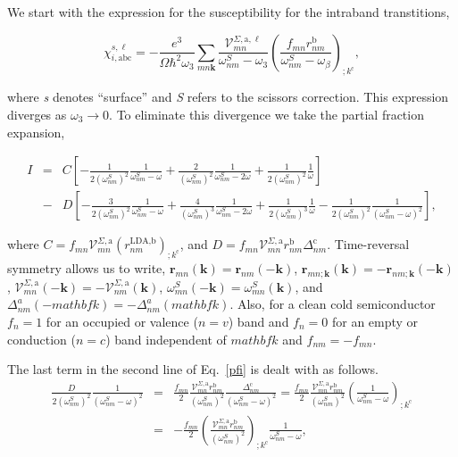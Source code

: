 \documentclass[11pt,draft]{article}
\begin{document}
We start with the expression for the susceptibility for the intraband transtitions,

\begin{equation}\label{chii}
\chi_{i,\text{a}\text{b}\text{c}}^{s,\ell}=-\frac{e^3}{\Omega\hbar^2\omega_3}\sum_{mn\mathbf{k}}\frac{\mathcal{V}_{mn}^{\Sigma,\text{a},\ell}}{\omega^S_{nm}-\omega_3}\left(\frac{f_{mn}r_{nm}^{\text{b}}}{\omega^S_{nm}-\omega_\beta}\right)_{;k^{\text{c}}},
\end{equation} 

where \emph{s} denotes ``surface'' and \emph{S} refers to the scissors correction. This expression diverges as $\omega_{3} \rightarrow 0$. To eliminate this divergence we take the partial fraction expansion,

\begin{eqnarray}\label{pfi} 
I &=& C \left[-\frac{1}{2(\omega^{S}_{nm})^{2}}\frac{1}{\omega^{S}_{nm}-\omega}+\frac{2}{(\omega^{S}_{nm})^{2}}\frac{1}{\omega^{S}_{nm}-2\omega}+\frac{1}{2(\omega^{S}_{nm})^{2}}\frac{1}{\omega}\right]\nonumber\\
&-& D \left[-\frac{3}{2(\omega^{S}_{nm})^{2}}\frac{1}{\omega^{S}_{nm}-\omega}+\frac{4}{(\omega^{S}_{nm})^{3}}\frac{1}{\omega^{S}_{nm}-2\omega}+\frac{1}{2(\omega^{S}_{nm})^{3}}\frac{1}{\omega}-\frac{1}{2(\omega^{S}_{nm})^{2}}\frac{1}{(\omega^{S}_{nm}-\omega)^2}\right],
\end{eqnarray} 

where $C = f_{mn}\mathcal{V}^{\Sigma,\text{a}}_{mn}(r^{\text{LDA},\text{b}}_{nm})_{;k^{\text{c}}}$, and $D=f_{mn}\mathcal{V}^{\Sigma,\text{a}}_{mn}r^{\text{b}}_{nm}\Delta^{\text{c}}_{nm}$. Time-reversal symmetry allows us to write, $\mathbf{r}_{mn}(\mathbf{k})=\mathbf{r}_{nm}(-\mathbf{k})$, $\mathbf{r}_{mn;\mathbf{k}}(\mathbf{k})=-\mathbf{r}_{nm;\mathbf{k}}(-\mathbf{k})$, $\mathbf{\mathcal{V}}_{mn}^{\Sigma,\text{a}}(-\mathbf{k})=-\mathbf{\mathcal{V}}_{nm}^{\Sigma,\text{a}}(\mathbf{k})$, $\omega_{mn}^{S}(-\mathbf{k})=\omega_{mn}^{S}(\mathbf{k})$, and $\Delta^a_{nm}(-mathbf{k})=-\Delta^a_{nm}(mathbf{k})$. Also, for a clean cold semiconductor $f_n=1$  for an occupied or valence ($n=v$) band and $f_n=0$ for an empty or conduction ($n=c$) band independent of $mathbf{k}$ and $f_{nm}=-f_{mn}$.

The last term in the second line of Eq.~\eqref{pfi} is dealt with as follows.
\begin{eqnarray}\label{dresn}
\frac{D}{2(\omega^S_{nm})^2}\frac{1}{(\omega^S_{nm}-\omega)^2} 
&=& \frac{f_{mn}}{2}\frac{\mathcal{V}^{\Sigma,\text{a}}_{mn}r^{\text{b}}_{nm}}{(\omega^S_{nm})^2}\frac{\Delta^{\text{c}}_{nm}}{(\omega^S_{nm}-\omega)^2} = \frac{f_{mn}}{2}\frac{\mathcal{V}^{\Sigma,\text{a}}_{mn}r^{\text{b}}_{nm}}{(\omega^S_{nm})^2}\left(\frac{1}{\omega^S_{nm}-\omega}\right)_{;k^{\text{c}}}\nonumber\\
&=& -\frac{f_{mn}}{2}\left(\frac{\mathcal{V}^{\Sigma,\text{a}}_{mn}r^{\text{b}}_{nm}}{(\omega^S_{nm})^2}\right)_{;k^{\text{c}}}\frac{1}{\omega^S_{nm}-\omega},
\end{eqnarray} 
\end{document}
